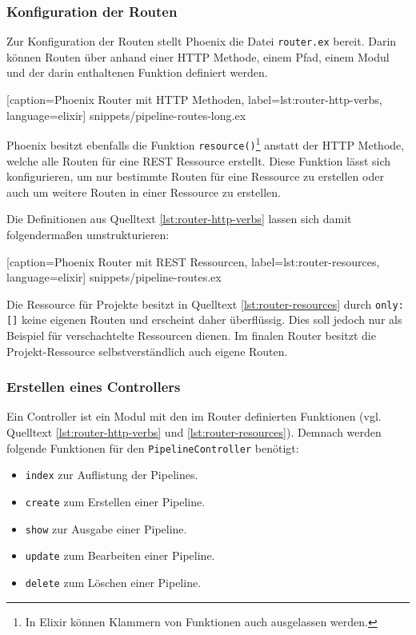 \subsubsection{Konfiguration der Routen}

Zur Konfiguration der Routen stellt Phoenix die Datei \texttt{router.ex} bereit. Darin können Routen über anhand einer HTTP Methode, einem Pfad, einem Modul und der darin enthaltenen Funktion definiert werden.


  [caption={Phoenix Router mit HTTP Methoden},
  label={lst:router-http-verbs},
  language=elixir]
  {snippets/pipeline-routes-long.ex}

Phoenix besitzt ebenfalls die Funktion \texttt{resource()}\footnote{In Elixir können Klammern von Funktionen auch ausgelassen werden.} anstatt der HTTP Methode, welche alle Routen für eine REST Ressource erstellt. Diese Funktion lässt sich konfigurieren, um nur bestimmte Routen für eine Ressource zu erstellen oder auch um weitere Routen in einer Ressource zu erstellen.

Die Definitionen aus Quelltext \ref{lst:router-http-verbs} lassen sich damit folgendermaßen umstrukturieren:


  [caption={Phoenix Router mit REST Ressourcen},
  label={lst:router-resources},
  language=elixir]
  {snippets/pipeline-routes.ex}

Die Ressource für Projekte besitzt in Quelltext \ref{lst:router-resources} durch \texttt{only: []} keine eigenen Routen und erscheint daher überflüssig. Dies soll jedoch nur als Beispiel für verschachtelte Ressourcen dienen. Im finalen Router besitzt die Projekt-Ressource selbstverständlich auch eigene Routen.

\subsubsection{Erstellen eines Controllers}

Ein Controller ist ein Modul mit den im Router definierten Funktionen (vgl. Quelltext \ref{lst:router-http-verbs} und \ref{lst:router-resources}). Demnach werden folgende Funktionen für den \texttt{PipelineController} benötigt:

\begin{itemize}
  \item \texttt{index} zur Auflistung der Pipelines.
  \item \texttt{create} zum Erstellen einer Pipeline.
  \item \texttt{show} zur Ausgabe einer Pipeline.
  \item \texttt{update} zum Bearbeiten einer Pipeline.
  \item \texttt{delete} zum Löschen einer Pipeline.
\end{itemize}

